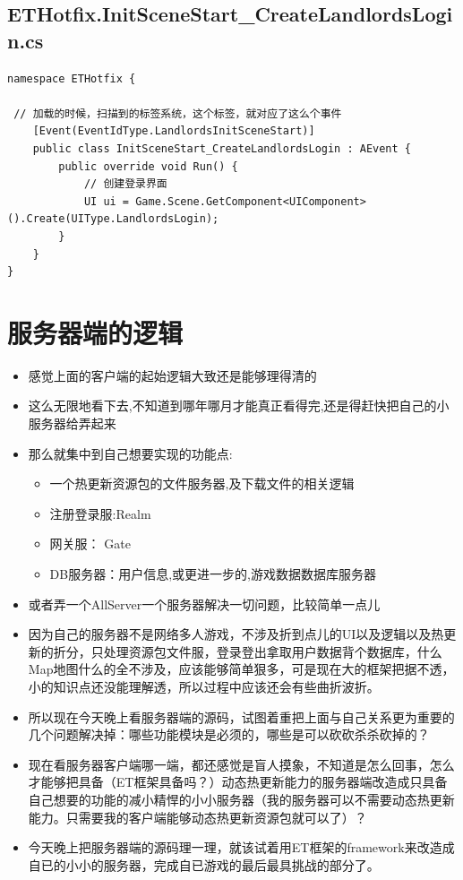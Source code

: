 \documentclass[9pt, b5paper]{article}
\begin{document}
\subsection{ETHotfix.InitSceneStart\_CreateLandlordsLogin.cs}
\label{sec-1-4}
\begin{verbatim}
namespace ETHotfix {

 // 加载的时候，扫描到的标签系统，这个标签，就对应了这么个事件    
    [Event(EventIdType.LandlordsInitSceneStart)]
    public class InitSceneStart_CreateLandlordsLogin : AEvent {
        public override void Run() {
            // 创建登录界面
            UI ui = Game.Scene.GetComponent<UIComponent>().Create(UIType.LandlordsLogin);
        }
    }
}
\end{verbatim}

\section{服务器端的逻辑}
\label{sec-2}
\begin{itemize}
\item 感觉上面的客户端的起始逻辑大致还是能够理得清的
\item 这么无限地看下去,不知道到哪年哪月才能真正看得完,还是得赶快把自己的小服务器给弄起来
\item 那么就集中到自己想要实现的功能点:
\begin{itemize}
\item 一个热更新资源包的文件服务器,及下载文件的相关逻辑
\item 注册登录服:Realm
\item 网关服： Gate
\item DB服务器：用户信息,或更进一步的,游戏数据数据库服务器
\end{itemize}
\item 或者弄一个AllServer一个服务器解决一切问题，比较简单一点儿
\item 因为自己的服务器不是网络多人游戏，不涉及折到点儿的UI以及逻辑以及热更新的折分，只处理资源包文件服，登录登出拿取用户数据背个数据库，什么Map地图什么的全不涉及，应该能够简单狠多，可是现在大的框架把据不透，小的知识点还没能理解透，所以过程中应该还会有些曲折波折。
\item 所以现在今天晚上看服务器端的源码，试图着重把上面与自己关系更为重要的几个问题解决掉：哪些功能模块是必须的，哪些是可以砍砍杀杀砍掉的？
\item 现在看服务器客户端哪一端，都还感觉是盲人摸象，不知道是怎么回事，怎么才能够把具备（ET框架具备吗？）动态热更新能力的服务器端改造成只具备自己想要的功能的减小精悍的小小服务器（我的服务器可以不需要动态热更新能力。只需要我的客户端能够动态热更新资源包就可以了）？
\item 今天晚上把服务器端的源码理一理，就该试着用ET框架的framework来改造成自已的小小的服务器，完成自已游戏的最后最具挑战的部分了。
\end{itemize}
\end{document}
